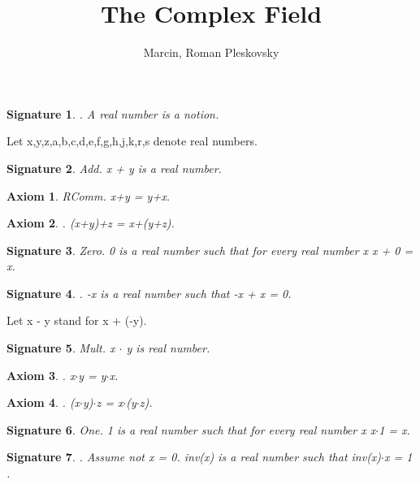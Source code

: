 \documentclass{article}
\newenvironment{forthel}{\begin{leftbar}}{\end{leftbar}}
\newtheorem{axiom}{Axiom}
\newtheorem{signature}{Signature}
\begin{document}
\title{The Complex Field}
\author{Marcin, Roman Pleskovsky}
\maketitle

\begin{forthel}
[set/-s] [element/-s] [number/-s]
\begin{signature}. A real number is a notion.

\end{signature}


Let x,y,z,a,b,c,d,e,f,g,h,j,k,r,s denote real numbers.



\begin{signature} Add. x + y is a real number.

\end{signature}
\begin{axiom} RComm. x+y = y+x.

\end{axiom}
\begin{axiom}. (x+y)+z = x+(y+z).

\end{axiom}
\begin{signature} Zero. 0 is a real number such that for every real number x x + 0 = x.

\end{signature}
\begin{signature}. -x is a real number such that -x + x = 0.

\end{signature}

Let x - y stand for x + (-y).

\begin{signature} Mult. x $\cdot$ y is real number.

\end{signature}
\begin{axiom}. x$\cdot$y = y$\cdot$x.

\end{axiom}
\begin{axiom}. (x$\cdot$y)$\cdot$z = x$\cdot$(y$\cdot$z).

\end{axiom}
\begin{signature} One. 1 is a real number such that for every real number x x$\cdot$1 = x.

\end{signature}
\begin{signature}. Assume not x = 0. inv(x) is a real number such that inv(x)$\cdot$x = 1 .


\end{signature}
\end{forthel}
\end{document}
